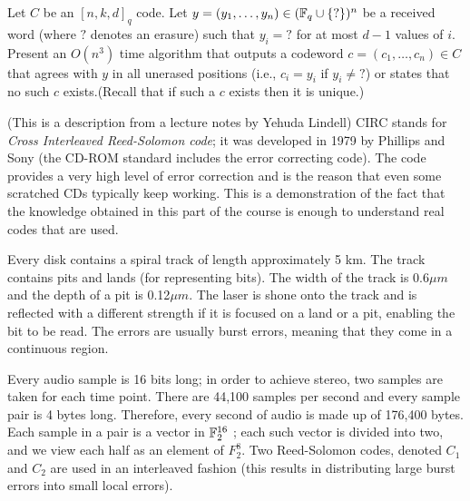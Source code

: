 \begin{exercise}
Let $C$ be an $[n,k,d]_q$ code. Let $y = (y_1, \ldots , y_n) \in ({\mathbb{F}}_q \cup \{?\})^n$ be a received word (where $?$ denotes an erasure) such that $y_i=?$ for at most $d-1$ values of $i$. Present an $O(n^3)$ time algorithm that outputs a codeword 
$c = (c_1, \ldots , c_n) \in C$ that agrees with $y$ in all unerased positions (i.e., $c_i = y_i$ if $y_i \ne ?$) or
states that no such $c$ exists.(Recall that if such a $c$ exists then it is unique.)
\end{exercise}

\begin{curiousity}
(This is a description from a lecture notes by Yehuda Lindell)
{\sf CIRC} stands for \textit{Cross Interleaved Reed-Solomon code}; it was developed in 1979 by Phillips and Sony (the
CD-ROM standard includes the error correcting code). The code provides a very high level of error correction
and is the reason that even some scratched CDs typically keep working. This is a demonstration of the fact that the knowledge obtained in this part of the course is enough to understand real codes that are used.

Every disk contains a spiral track of length approximately 5 km. The track contains pits and lands (for representing bits). The width of the track is 0.6$\mu m$ and the depth of a pit is 0.12$\mu m$. The laser
is shone onto the track and is reflected with a different strength if it is focused on a land or a pit, enabling
the bit to be read. The errors are usually burst
errors, meaning that they come in a continuous region.

Every audio sample is 16 bits long; in order to achieve stereo, two samples are taken for each time point.
There are 44,100 samples per second and every sample pair is 4 bytes long. Therefore, every second of audio
is made up of 176,400 bytes. Each sample in a pair is a vector in ${\mathbb{F}}_2^{16}$ ; each such vector is divided into two,
and we view each half as an element of $F_2^8$. Two Reed-Solomon
codes, denoted $C_1$ and $C_2$ are used in an interleaved fashion (this results in distributing large burst errors
into small local errors).
\end{curiousity}
